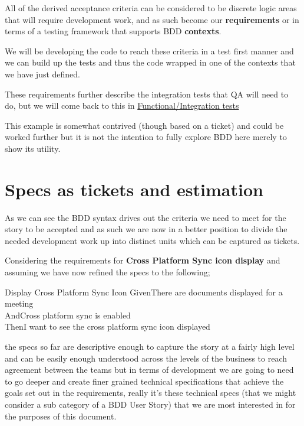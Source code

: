 \documentclass[a4paper, titlepage]{article}
\begin{document}
  All of the derived acceptance criteria can be considered to be discrete
  logic areas that will require development work, and as such become 
  our \textbf{requirements} or in terms of a testing framework that supports BDD 
  \textbf{contexts}.
  
  We will be developing the code to reach these criteria in a test
  first manner and we can build up the tests and thus the code wrapped
  in one of the contexts that we have just defined.

  These requirements further describe the integration tests
  that QA will need to do, but we will come back to this in \hyperref[sec:integration tests]{Functional/Integration tests}
  
  This example is somewhat contrived (though based on a ticket) and could 
  be worked further but it is not the intention to
  fully explore BDD here merely to show its utility.

\section{Specs as tickets and estimation}
  As we can see the BDD syntax drives out the criteria we need to meet
  for the story to be accepted and as such we are now in a better
  position to divide the needed development work up into distinct units which can be
  captured as tickets.

  Considering the requirements for \textbf{Cross Platform Sync icon display}
  and assuming we have now refined the specs to the following;

  \begin{tspec}{1}{Display Cross Platform Sync Icon}
    \ac{Given}{There are documents displayed for a meeting}\\
    \ac{And}{Cross platform sync is enabled}\\
    \ac{Then}{I want to see the cross platform sync icon displayed}
  \end{tspec}

  the specs so far are descriptive enough to capture
  the story at a fairly high level and can be easily enough
  understood across the levels of the business  to reach agreement
  between the teams but in terms of
  development we are going to need to go deeper and create finer grained
  technical specifications that achieve the goals set out in the
  requirements, really it's these technical specs
  (that we might consider a sub category of a BDD User Story) that we
  are most interested in for the purposes of this document.
\end{document}
